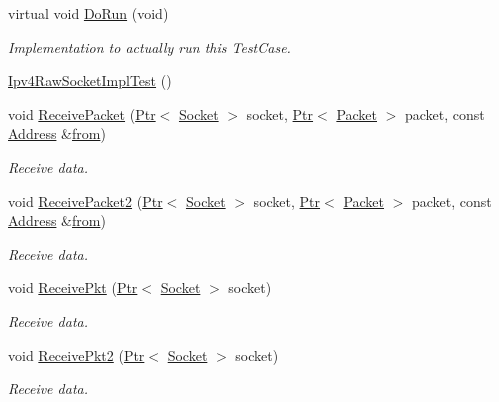 \begin{DoxyCompactItemize}
\item 
virtual void \hyperlink{classIpv4RawSocketImplTest_a94a6b1e1e8aeec37dcb6e8c8788b1e66}{Do\+Run} (void)
\begin{DoxyCompactList}\small\item\em Implementation to actually run this Test\+Case. \end{DoxyCompactList}\item 
\hyperlink{classIpv4RawSocketImplTest_a5e62800a96b08a1a5920810bcd722503}{Ipv4\+Raw\+Socket\+Impl\+Test} ()
\item 
void \hyperlink{classIpv4RawSocketImplTest_ab900852936a9865181ac59e41f607c4d}{Receive\+Packet} (\hyperlink{classns3_1_1Ptr}{Ptr}$<$ \hyperlink{classns3_1_1Socket}{Socket} $>$ socket, \hyperlink{classns3_1_1Ptr}{Ptr}$<$ \hyperlink{classns3_1_1Packet}{Packet} $>$ packet, const \hyperlink{classns3_1_1Address}{Address} \&\hyperlink{lte__amc_8m_a1b4c81ff74eb1a626b5ade44c81004b3}{from})
\begin{DoxyCompactList}\small\item\em Receive data. \end{DoxyCompactList}\item 
void \hyperlink{classIpv4RawSocketImplTest_aa492e03546340fda32e9305797d30792}{Receive\+Packet2} (\hyperlink{classns3_1_1Ptr}{Ptr}$<$ \hyperlink{classns3_1_1Socket}{Socket} $>$ socket, \hyperlink{classns3_1_1Ptr}{Ptr}$<$ \hyperlink{classns3_1_1Packet}{Packet} $>$ packet, const \hyperlink{classns3_1_1Address}{Address} \&\hyperlink{lte__amc_8m_a1b4c81ff74eb1a626b5ade44c81004b3}{from})
\begin{DoxyCompactList}\small\item\em Receive data. \end{DoxyCompactList}\item 
void \hyperlink{classIpv4RawSocketImplTest_a25582b4a4bcb5019a7fefc034b6e3ff8}{Receive\+Pkt} (\hyperlink{classns3_1_1Ptr}{Ptr}$<$ \hyperlink{classns3_1_1Socket}{Socket} $>$ socket)
\begin{DoxyCompactList}\small\item\em Receive data. \end{DoxyCompactList}\item 
void \hyperlink{classIpv4RawSocketImplTest_aa8913acb80b6b4644629066bfa04222d}{Receive\+Pkt2} (\hyperlink{classns3_1_1Ptr}{Ptr}$<$ \hyperlink{classns3_1_1Socket}{Socket} $>$ socket)
\begin{DoxyCompactList}\small\item\em Receive data. \end{DoxyCompactList}\end{DoxyCompactItemize}
